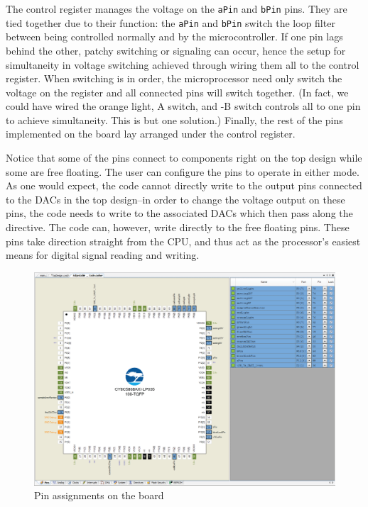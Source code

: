 \documentclass[10pt]{report}
\newcommand{\aPin}[0] {\texttt{aPin}}
\newcommand{\bPin}[0] {\texttt{bPin}}
\begin{document}
The control register manages the voltage on the \aPin{}  and \bPin{}  pins. They are tied together due to their function: the \aPin{}  and \bPin{}  switch the loop filter between being controlled normally and by the microcontroller. If one pin lags behind the other, patchy switching or signaling can occur, hence the setup for simultaneity in voltage switching achieved through wiring them all to the control register. When switching is in order, the microprocessor need only switch the voltage on the register and all connected pins will switch together. (In fact, we could have wired the orange light, A switch, and -B switch controls all to one pin to achieve simultaneity. This is but one solution.) Finally, the rest of the pins implemented on the board lay arranged under the control register.

Notice that some of the pins connect to components right on the top design while some are free floating. The user can configure the pins to operate in either mode. As one would expect, the code cannot directly write to the output pins connected to the DACs in the top design--in order to change the voltage output on these pins, the code needs to write to the associated DACs which then pass along the directive. The code can, however, write directly to the free floating pins. These pins take direction straight from the CPU, and thus act as the processor's easiest means for digital signal reading and writing.

\begin{figure}[h]
    \centering
    \includegraphics[width=\textwidth]{includes/relockerPinAssignments.png}
    \caption{Pin assignments on the board}
    \label{fig:relockerPinAssignments}
\end{figure}
\end{document}
